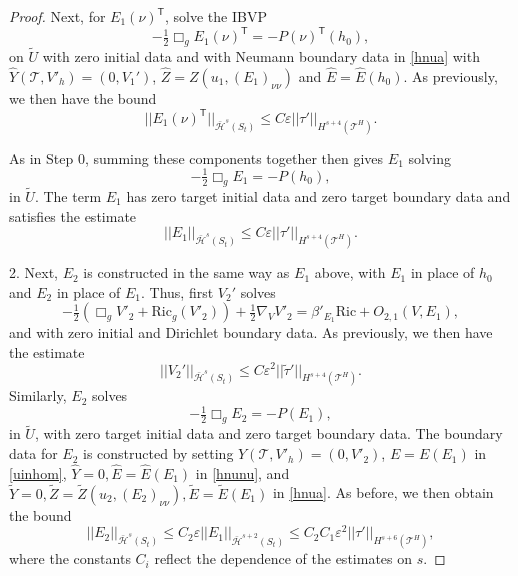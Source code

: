 \documentclass[10pt]{amsart}
\renewcommand{\b}{\beta}
\newcommand{\e}{\varepsilon}
\newcommand{\cT}{{\mathcal T}}
\newcommand{\cH}{{\mathcal H}}
\newcommand{\Ric}{\mathrm{Ric}}
\newcommand{\tT}{\mathsf{T}}
\renewcommand{\hat}{\widehat}
\newcommand{\<}{\langle}
\renewcommand{\>}{\rangle}
\newcommand{\w}{\widetilde}
\theoremstyle{plain}
\theoremstyle{remark}
\theoremstyle{definition}
\numberwithin{equation}{section}
\begin{document}
\begin{proof}
  Next, for $E_1(\nu)^{\tT}$, solve the IBVP 
$$-\tfrac{1}{2}\Box_g E_1(\nu)^{\tT} = -P(\nu)^{\tT}(h_0),$$
on $\w U$ with zero initial data and with Neumann boundary data in \eqref{hnua} with $\hat Y(\cT, V'_h) = (0, V_1')$, $\hat Z = Z(u_1, (E_1)_{\nu \nu})$ 
and $\hat E = \hat E(h_0)$. As previously, we then have the bound  
$$||E_1(\nu)^{\tT}||_{\bar \cH^s(S_t)} \leq  C\e||\tau'||_{H^{s+4}(\cT^H)}.$$


  As in Step 0, summing these components together then gives $E_1$ solving 
$$-\tfrac{1}{2}\Box_g E_1  = -P(h_0),$$
in $\w U$. The term $E_1$ has zero target initial data and zero target boundary data and satisfies the estimate 
$$||E_1||_{\bar \cH^s(S_t)} \leq C\e ||\tau'||_{H^{s+4}(\cT^H)}.$$

2. Next, $E_2$ is constructed in the same way as $E_1$ above, with $E_1$ in place of $h_0$ and $E_2$ in place of 
$E_1$. Thus, first $V_2'$ solves 
$$-\tfrac{1}{2}(\Box_g V'_2+ \Ric_g (V'_2)) + \tfrac{1}{2}\nabla_{V} V'_2 = \b'_{E_1} \Ric + O_{2,1}(V,E_1),$$
and with zero initial and Dirichlet boundary data. As previously, we then have the estimate 
$$||V_2'||_{\bar \cH^s(S_t)} \leq C\e^2  ||\w \tau'||_{H^{s+4}(\cT^H)}.$$
Similarly, $E_2$ solves 
$$-\tfrac{1}{2}\Box_g E_2  = -P(E_1),$$
in $\w U$, with zero target  initial data and zero target boundary data. The boundary data for $E_2$ is constructed by 
setting $Y(\cT, V'_h) = (0, V'_2)$, $E = E(E_1)$ in \eqref{uinhom}, $\hat Y = 0, \hat E = \hat E(E_1)$ in \eqref{hnunu}, 
and $\w Y = 0, \w Z = \w Z(u_2, (E_2)_{\nu\nu}), \w E = \w E(E_1)$ in \eqref{hnua}. As before, we then obtain the bound 
$$||E_2||_{\bar \cH^s(S_t)} \leq C_2\e ||E_1||_{\bar \cH^{s+2}(S_t)} \leq C_2 C_1\e^2||\tau'||_{H^{s+6}(\cT^H)},$$
where the constants $C_i$ reflect the dependence of the estimates on $s$. 


\end{proof}
\end{document}
